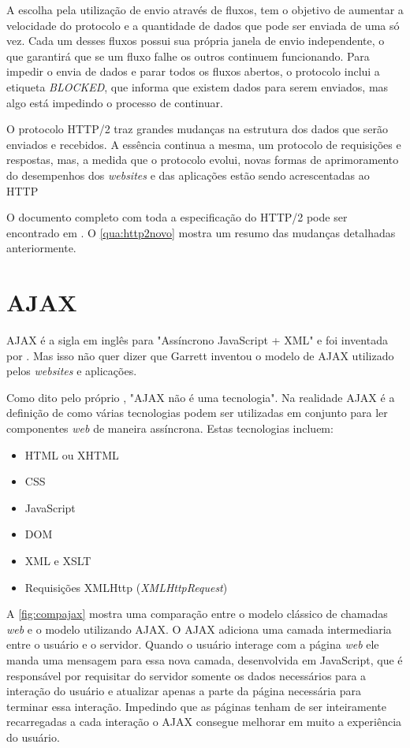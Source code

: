A escolha pela utilização de envio através de fluxos, tem o objetivo de aumentar a velocidade do protocolo e a quantidade de dados que pode ser enviada de uma só vez. Cada um desses fluxos possui sua própria janela de envio independente, o que garantirá que se um fluxo falhe os outros continuem funcionando. Para impedir o envia de dados e parar todos os fluxos abertos, o protocolo inclui a etiqueta \textit{BLOCKED}, que informa que existem dados para serem enviados, mas algo está impedindo o processo de continuar.

O protocolo HTTP/2 traz grandes mudanças na estrutura dos dados que serão enviados e recebidos. A essência continua a mesma, um protocolo de requisições e respostas, mas, a medida que o protocolo evolui, novas formas de aprimoramento do desempenhos dos \textit{websites} e das aplicações estão sendo acrescentadas ao HTTP

O documento completo com toda a especificação do HTTP/2 pode ser encontrado em \cite{HTTP2Spec}. O \autoref{qua:http2novo} mostra um resumo das mudanças detalhadas anteriormente.



\newpage
\section{AJAX}
\label{sec:ajax}
AJAX é a sigla em inglês para "Assíncrono JavaScript + XML" e foi inventada por \cite{AJAX}. Mas isso não quer dizer que Garrett inventou o modelo de AJAX utilizado pelos \textit{websites} e aplicações.

Como dito pelo próprio , "AJAX não é uma tecnologia". Na realidade AJAX é a definição de como várias tecnologias podem ser utilizadas em conjunto para ler componentes \textit{web} de maneira assíncrona. Estas tecnologias incluem:
	\begin{itemize}
		\item HTML ou XHTML
		\item CSS
		\item JavaScript
		\item DOM
		\item XML e XSLT
		\item Requisições XMLHttp (\textit{XMLHttpRequest})
	\end{itemize}

A \autoref{fig:compajax} mostra uma comparação entre o modelo clássico de chamadas \textit{web} e o modelo utilizando AJAX. O AJAX adiciona uma camada intermediaria entre o usuário e o servidor. Quando o usuário interage com a página \textit{web} ele manda uma mensagem para essa nova camada, desenvolvida em JavaScript, que é responsável por requisitar do servidor somente os dados necessários para a interação do usuário e atualizar apenas a parte da página necessária para terminar essa interação. Impedindo que as páginas tenham de ser inteiramente recarregadas a cada interação o AJAX consegue melhorar em muito a experiência do usuário.

